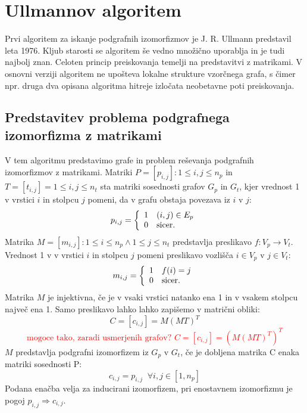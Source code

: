 \documentclass[a4paper, 12pt, ]{book}
\newcommand{\TODO}[1]{\textcolor{red}{#1}}
\begin{document}
\chapter{Ullmannov algoritem}
	
	Prvi algoritem za iskanje podgrafnih izomorfizmov je J. R. Ullmann predstavil leta 1976. Kljub starosti se algoritem še vedno množično uporablja
	in je tudi najbolj znan. Celoten princip preiskovanja temelji na predstavitvi z matrikami. V osnovni verziji algoritem ne upošteva lokalne strukture
	vzorčnega grafa, s čimer npr. druga dva opisana algoritma hitreje izločata neobetavne poti preiskovanja.
	
	\section{Predstavitev problema podgrafnega izomorfizma z matrikami}
	V tem algoritmu predstavimo grafe in problem reševanja podgrafnih izomorfizmov z matrikami. Matriki $P = [p_{i,j}] : 1 \le i,j \le n_p $ in
	$T = [t_{i,j}] = 1 \le i,j \le n_t$ sta matriki sosednosti grafov $G_p$ in $G_t$, kjer vrednost 1 v vrstici $i$ in stolpcu $j$ pomeni, 
	da v grafu obstaja povezava
	iz $i$ v $j$:
		\begin{equation}
		 	p_{i,j} = \left\{
			\begin{array}{l l}
			    1 & (i,j) \in E_p\\
			    0 & \text{sicer.}
			\end{array} \right.
		\end{equation}
	Matrika $M = [m_{i,j}]: 1 \le i \le n_p \wedge 1 \le j \le n_t$ predstavlja preslikavo $f: V_p \to V_t$. Vrednost 1 v v vrstici $i$ in stolpcu $j$ 
	pomeni preslikavo vozlišča
	$i \in V_p$ v $j \in V_t$:
		\begin{equation}
			m_{i,j} = \left\{
			\begin{array}{l l}
			    1 & f(i) = j\\
			    0 & \text{sicer.}
			\end{array} \right.
		\end{equation}
	Matrika $M$ je injektivna, če je v vsaki vrstici natanko ena 1 in v vsakem stolpcu največ ena 1. Samo preslikavo lahko lahko zapišemo v matrični obliki:
		\begin{equation}
			C = [c_{i,j}] = M(MT)^T
		\end{equation}
		\TODO{
		$$%
			\text{mogoce tako, zaradi usmerjenih grafov? } C = [c_{i,j}] = (M(MT)^T)^T
		$$%
		}
	$M$ predstavlja podgrafni izomorfizem iz $G_p$ v $G_t$, če je dobljena matrika C enaka matriki sosednosti P:
		\begin{equation}
			\label{eq:ullmann1}
			c_{i,j} = p_{i,j}\;\; \forall i,j \in [1, n_p]
		\end{equation}	 
	Podana enačba velja za inducirani izomorfizem, pri enostavnem izomorfizmu je pogoj $p_{i,j} \Rightarrow c_{i, j}$.
	
\end{document}
